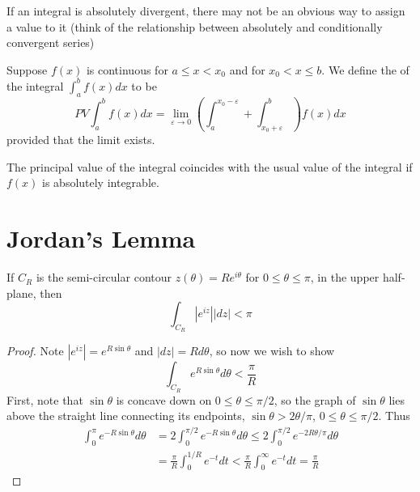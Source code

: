 If an integral is absolutely divergent, there may not be an obvious way to assign a value to it (think of the relationship between absolutely and conditionally convergent series)

\begin{definition}
    Suppose $f(x)$ is continuous for $a \leq x < x_0$ and for $x_0 < x\leq b$. We define the  of the integral $\int_a^bf(x)dx$ to be \begin{equation*}
        PV\int_a^bf(x)dx = \lim\limits_{\varepsilon\rightarrow 0}\left(\int_a^{x_0-\varepsilon}+\int_{x_0+\varepsilon}^b\right)f(x)dx
    \end{equation*}
    provided that the limit exists.
\end{definition}
The principal value of the integral coincides with the usual value of the integral if $f(x)$ is absolutely integrable.



\section{Jordan's Lemma}

\begin{lemma}
    If $C_R$ is the semi-circular contour $z(\theta) = Re^{i\theta}$ for $0 \leq \theta \leq \pi$, in the upper half-plane, then \begin{equation*}
        \int_{C_R}|e^{iz}||dz| < \pi
    \end{equation*}
\end{lemma}
\begin{proof}
    Note $|e^{iz}| = e^{R\sin\theta}$ and $|dz| = Rd\theta$, so now we wish to show \begin{equation*}
        \int_{C_R}e^{R\sin\theta}d\theta < \frac{\pi}{R}
    \end{equation*}
    First, note that $\sin\theta$ is concave down on $0\leq \theta\leq \pi/2$, so the graph of $\sin\theta$ lies above the straight line connecting its endpoints, $\sin\theta >2\theta/\pi$, $0\leq\theta\leq \pi/2$. Thus \begin{align*}
        \int_0^{\pi}e^{-R\sin\theta}d\theta &= 2\int_0^{\pi/2}e^{-R\sin\theta}d\theta \leq 2 \int_0^{\pi/2}e^{-2R\theta/\pi}d\theta \\
        &= \frac{\pi}{R}\int_0^{1/R}e^{-t}dt < \frac{\pi}{R}\int_0^{\infty}e^{-t}dt = \frac{\pi}{R}
    \end{align*}
\end{proof}


